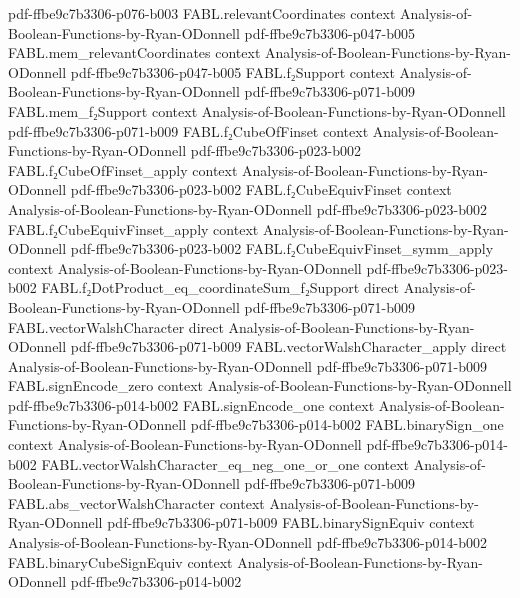 \begin{theorem}
  {pdf-ffbe9c7b3306-p076-b003}
\proofstep
  {FABL.relevantCoordinates}
  {context}
  {Analysis-of-Boolean-Functions-by-Ryan-ODonnell}
  {pdf-ffbe9c7b3306-p047-b005}
\proofstep
  {FABL.mem_relevantCoordinates}
  {context}
  {Analysis-of-Boolean-Functions-by-Ryan-ODonnell}
  {pdf-ffbe9c7b3306-p047-b005}
\proofstep
  {FABL.f₂Support}
  {context}
  {Analysis-of-Boolean-Functions-by-Ryan-ODonnell}
  {pdf-ffbe9c7b3306-p071-b009}
\proofstep
  {FABL.mem_f₂Support}
  {context}
  {Analysis-of-Boolean-Functions-by-Ryan-ODonnell}
  {pdf-ffbe9c7b3306-p071-b009}
\proofstep
  {FABL.f₂CubeOfFinset}
  {context}
  {Analysis-of-Boolean-Functions-by-Ryan-ODonnell}
  {pdf-ffbe9c7b3306-p023-b002}
\proofstep
  {FABL.f₂CubeOfFinset_apply}
  {context}
  {Analysis-of-Boolean-Functions-by-Ryan-ODonnell}
  {pdf-ffbe9c7b3306-p023-b002}
\proofstep
  {FABL.f₂CubeEquivFinset}
  {context}
  {Analysis-of-Boolean-Functions-by-Ryan-ODonnell}
  {pdf-ffbe9c7b3306-p023-b002}
\proofstep
  {FABL.f₂CubeEquivFinset_apply}
  {context}
  {Analysis-of-Boolean-Functions-by-Ryan-ODonnell}
  {pdf-ffbe9c7b3306-p023-b002}
\proofstep
  {FABL.f₂CubeEquivFinset_symm_apply}
  {context}
  {Analysis-of-Boolean-Functions-by-Ryan-ODonnell}
  {pdf-ffbe9c7b3306-p023-b002}
\proofstep
  {FABL.f₂DotProduct_eq_coordinateSum_f₂Support}
  {direct}
  {Analysis-of-Boolean-Functions-by-Ryan-ODonnell}
  {pdf-ffbe9c7b3306-p071-b009}
\proofstep
  {FABL.vectorWalshCharacter}
  {direct}
  {Analysis-of-Boolean-Functions-by-Ryan-ODonnell}
  {pdf-ffbe9c7b3306-p071-b009}
\proofstep
  {FABL.vectorWalshCharacter_apply}
  {direct}
  {Analysis-of-Boolean-Functions-by-Ryan-ODonnell}
  {pdf-ffbe9c7b3306-p071-b009}
\proofstep
  {FABL.signEncode_zero}
  {context}
  {Analysis-of-Boolean-Functions-by-Ryan-ODonnell}
  {pdf-ffbe9c7b3306-p014-b002}
\proofstep
  {FABL.signEncode_one}
  {context}
  {Analysis-of-Boolean-Functions-by-Ryan-ODonnell}
  {pdf-ffbe9c7b3306-p014-b002}
\proofstep
  {FABL.binarySign_one}
  {context}
  {Analysis-of-Boolean-Functions-by-Ryan-ODonnell}
  {pdf-ffbe9c7b3306-p014-b002}
\proofstep
  {FABL.vectorWalshCharacter_eq_neg_one_or_one}
  {context}
  {Analysis-of-Boolean-Functions-by-Ryan-ODonnell}
  {pdf-ffbe9c7b3306-p071-b009}
\proofstep
  {FABL.abs_vectorWalshCharacter}
  {context}
  {Analysis-of-Boolean-Functions-by-Ryan-ODonnell}
  {pdf-ffbe9c7b3306-p071-b009}
\proofstep
  {FABL.binarySignEquiv}
  {context}
  {Analysis-of-Boolean-Functions-by-Ryan-ODonnell}
  {pdf-ffbe9c7b3306-p014-b002}
\proofstep
  {FABL.binaryCubeSignEquiv}
  {context}
  {Analysis-of-Boolean-Functions-by-Ryan-ODonnell}
  {pdf-ffbe9c7b3306-p014-b002}

\end{theorem}
